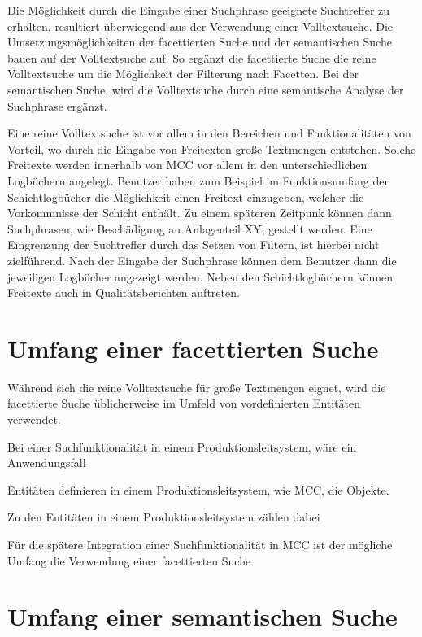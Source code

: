 Die Möglichkeit durch die Eingabe einer Suchphrase geeignete Suchtreffer zu erhalten, resultiert überwiegend aus der Verwendung einer Volltextsuche. Die Umsetzungsmöglichkeiten der facettierten Suche und der semantischen Suche bauen auf der Volltextsuche auf. So ergänzt die facettierte Suche die reine Volltextsuche um die Möglichkeit der Filterung nach Facetten. Bei der semantischen Suche, wird die Volltextsuche durch eine semantische Analyse der Suchphrase ergänzt.

Eine reine Volltextsuche ist vor allem in den Bereichen und Funktionalitäten von Vorteil, wo durch die Eingabe von Freitexten große Textmengen entstehen. Solche Freitexte werden innerhalb von MCC vor allem in den unterschiedlichen Logbüchern angelegt. Benutzer haben zum Beispiel im Funktionsumfang der Schichtlogbücher die Möglichkeit einen Freitext einzugeben, welcher die Vorkommnisse der Schicht enthält. Zu einem späteren Zeitpunk können dann Suchphrasen, wie \glqq Beschädigung an Anlagenteil XY\grqq{}, gestellt werden. Eine Eingrenzung der Suchtreffer durch das Setzen von Filtern, ist hierbei nicht zielführend. Nach der Eingabe der Suchphrase können dem Benutzer dann die jeweiligen Logbücher angezeigt werden. Neben den Schichtlogbüchern können Freitexte auch in Qualitätsberichten auftreten.

\section{Umfang einer facettierten Suche\label{sec3.3:Unterpunkt-3}}

Während sich die reine Volltextsuche für große Textmengen eignet, wird die facettierte Suche üblicherweise im Umfeld von vordefinierten Entitäten verwendet.



Bei einer Suchfunktionalität in einem Produktionsleitsystem, wäre ein Anwendungsfall

Entitäten definieren in einem Produktionsleitsystem, wie MCC, die Objekte.

Zu den Entitäten in einem Produktionsleitsystem zählen dabei 

Für die spätere Integration einer Suchfunktionalität in MCC ist der mögliche Umfang die Verwendung einer facettierten Suche 

\section{Umfang einer semantischen Suche\label{sec3.4:Unterpunkt-4}}

